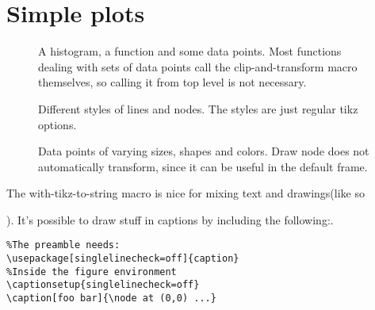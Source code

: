\documentclass{article}
\begin{document}
\section{Simple plots}
\begin{figure}[H]
\centering

\captionsetup{singlelinecheck=off}
\caption[asdf]{A histogram, a function and some data points. Most functions 
dealing with sets of data points call the clip-and-transform macro themselves, so calling it from 
top level is not necessary.}
\end{figure}
\begin{figure}[H]
\centering

\captionsetup{singlelinecheck=off}
\caption[asdf]{Different styles of lines and nodes. The styles are just regular tikz options.}
\end{figure}
\begin{figure}[H]
\centering

\captionsetup{singlelinecheck=off}
\caption[asdf]{Data points of varying sizes, shapes and colors. Draw node does not automatically transform, 
since it can be useful in the default frame.}
\end{figure}


The with-tikz-to-string macro is nice for mixing text and drawings(like so 
). It's possible to draw stuff in captions
by including the following:.
\begin{verbatim}
%The preamble needs:
\usepackage[singlelinecheck=off]{caption}
%Inside the figure environment
\captionsetup{singlelinecheck=off}
\caption[foo bar]{\node at (0,0) ...}
\end{verbatim}
\end{document}
